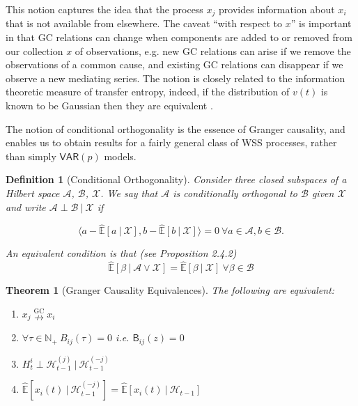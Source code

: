 \documentclass{statsoc}
\def\ngc{\overset{\text{GC}}{\nrightarrow}}  %
\def\VAR{\mathsf{VAR}}  %
\def\B{\mathsf{B}}  %
\def\H{\mathcal{H}}  %
\newcommand{\linE}[2]{\hat{\E}[#1\ |\ #2]}  %
\newtheorem{theorem}{Theorem}
\newtheorem{definition}{Definition}
\def\H{\mathcal{H}}  %
\def\E{\mathbb{E}}  %
\def\N{\mathbb{N}}  %
\newcommand{\inner}[2]{\langle #1, #2 \rangle}  %
\begin{document}
This notion captures the idea that the process $x_j$ provides
information about $x_i$ that is not available from elsewhere.  The
caveat ``with respect to $x$'' is important in that GC relations can
change when components are added to or removed from our collection $x$
of observations, e.g. new GC relations can arise if we remove the
observations of a common cause, and existing GC relations can
disappear if we observe a new mediating series. The notion is closely
related to the information theoretic measure of transfer entropy,
indeed, if the distribution of $v(t)$ is known to be Gaussian then
they are equivalent \cite{barnett2009granger}.

The notion of conditional orthogonality is the essence of
Granger causality, and enables us to obtain results for a fairly
general class of WSS processes, rather than simply $\VAR(p)$ models.

\begin{definition}[Conditional Orthogonality]
  \label{lem:conditional_orthogonality_equivalence}
  Consider three closed subspaces of a Hilbert space $\mathcal{A}$,
  $\mathcal{B}$, $\mathcal{X}$.  We say that $\mathcal{A}$ is
  conditionally orthogonal to $\mathcal{B}$ given $\mathcal{X}$
  and write $\mathcal{A} \perp \mathcal{B}\ |\ \mathcal{X}$ if

    \begin{equation*}
      \inner{a - \linE{a}{\mathcal{X}}}{b - \linE{b}{\mathcal{X}}} = 0\ \forall a \in \mathcal{A}, b \in \mathcal{B}.
    \end{equation*}

  An equivalent condition is that (see \cite{lindquist} Proposition 2.4.2)
  \begin{equation*}
    \linE{\beta}{\mathcal{A} \vee \mathcal{X}} = \linE{\beta}{\mathcal{X}}\ \forall \beta \in \mathcal{B}
  \end{equation*}
\end{definition}

\begin{theorem}[Granger Causality Equivalences]
  \label{thm:granger_causality_equivalences}
  The following are equivalent:

  \begin{enumerate}
    \item{$x_j \ngc x_i$}
    \item{$\forall \tau \in \N_+\ B_{ij}(\tau) = 0$ i.e. $\B_{ij}(z) = 0$}
    \item{$H_t^{i} \perp \H_{t - 1}^{(j)}\ |\ \H_{t - 1}^{(-j)}$}
    \item{$\linE{x_i(t)}{\H_{t - 1}^{(-j)}} = \linE{x_i(t)}{\H_{t - 1}}$}
  \end{enumerate}
\end{theorem}
\end{document}
